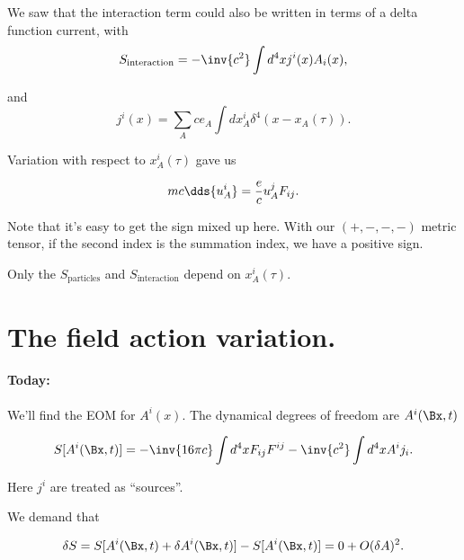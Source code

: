 We saw that the interaction term could also be written in terms of a delta function current, with
\begin{equation}\label{eqn:relativisticElectrodynamicsL13:50}
S_{\text{interaction}}
= -\inv{c^2} \int d^4x j^i(x) A_i(x),
\end{equation}

and
\begin{equation}\label{eqn:relativisticElectrodynamicsL13:70}
j^i(x) = \sum_A c e_A \int dx_A^i \delta^4( x - x_A(\tau)).
\end{equation}

Variation with respect to $x_A^i(\tau)$ gave us

\begin{equation}\label{eqn:relativisticElectrodynamicsL13:90}
m c \dds{u^i_A} = \frac{e}{c} u_A^j F_{ij}.
\end{equation}

Note that it's easy to get the sign mixed up here.  With our $(+,-,-,-)$ metric tensor, if the second index is the summation index, we have a positive sign.

Only the $S_{\text{particles}}$ and $S_{\text{interaction}}$ depend on $x_A^i(\tau)$.

\section{The field action variation.}

\paragraph{Today:} We'll find the EOM for $A^i(x)$.  The dynamical degrees of freedom are $A^i(\Bx,t)$

\begin{equation}\label{eqn:relativisticElectrodynamicsL13:110}
S[A^i(\Bx, t)] = -\inv{16 \pi c} \int d^4x F_{ij}F^{ij} - \inv{c^2} \int d^4 x A^i j_i.
\end{equation}

Here $j^i$ are treated as ``sources''.

We demand that

\begin{equation}\label{eqn:relativisticElectrodynamicsL13:130}
\delta S = S[ A^i(\Bx, t) + \delta A^i(\Bx, t)] - S[ A^i(\Bx, t) ] = 0 + O(\delta A)^2.
\end{equation}

